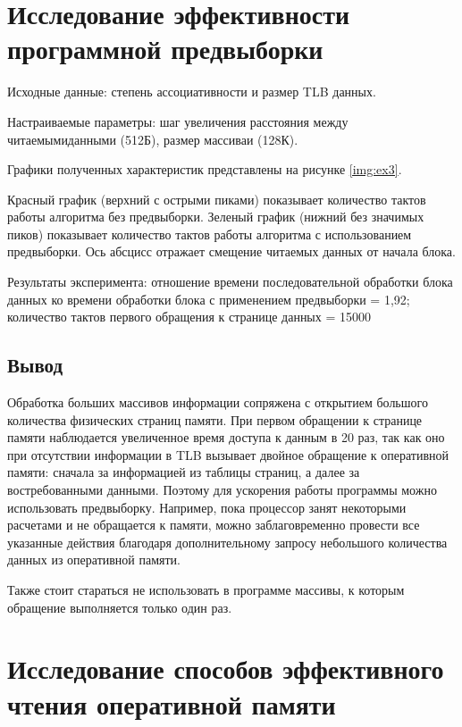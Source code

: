 \chapter*{Исследование эффективности программной предвыборки}

Исходные данные: степень ассоциативности и размер TLB данных.


Настраиваемые параметры: шаг увеличения расстояния между  читаемымиданными (512Б), размер массиваи (128К).

Графики полученных характеристик представлены на рисунке \ref{img:ex3}.



Красный график (верхний с острыми пиками) показывает количество тактов работы алгоритма без предвыборки. Зеленый график (нижний без значимых пиков) показывает количество тактов работы алгоритма с использованием предвыборки. Ось абсцисс отражает смещение читаемых данных от начала блока.

Результаты эксперимента: отношение времени последовательной обработки блока
данных ко времени обработки блока с применением предвыборки = 1,92; количество тактов первого обращения к странице данных = 15000

\section*{Вывод}
 Обработка больших массивов информации сопряжена с открытием большого количества физических страниц памяти. При первом обращении к странице памяти наблюдается увеличенное время доступа к данным в 20 раз, так как оно при отсутствии информации в TLB вызывает двойное обращение к оперативной памяти: сначала за информацией из таблицы страниц, а далее за востребованными данными. Поэтому для ускорения работы программы можно использовать предвыборку. Например, пока процессор занят некоторыми расчетами и не обращается к памяти, можно заблаговременно провести все указанные действия благодаря дополнительному запросу небольшого количества данных из оперативной памяти. 

Также стоит стараться не использовать в программе массивы, к которым обращение выполняется только один раз.


\chapter*{Исследование способов эффективного чтения оперативной памяти}

